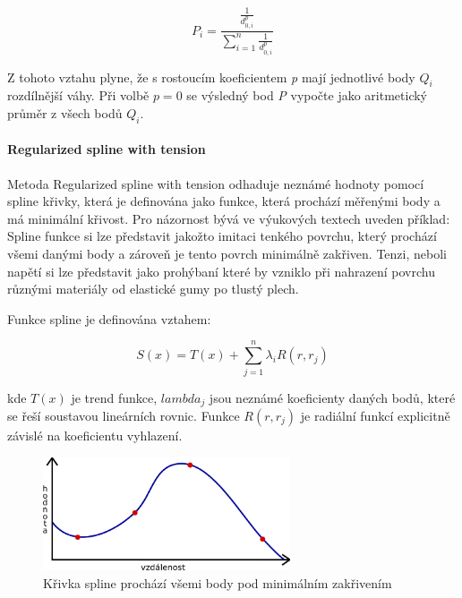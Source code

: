 \documentclass[a4paper,12pt]{report}
\begin{document}
\begin{equation}
P_{i}=\frac{\frac{1}{d_{0,i}^{p}}}{\sum_{i=1}^{n}\frac{1}{d_{0,i}^{p}}}
\end{equation}

Z tohoto vztahu plyne, že s rostoucím koeficientem \emph{p} mají jednotlivé  body $Q_{i}$ rozdílnější váhy. Při volbě $p=0$ se výsledný bod \emph{P} vypočte jako aritmetický průměr z všech bodů $Q_{i}$.

\paragraph*{Regularized spline with tension}

Metoda Regularized spline with tension odhaduje neznámé hodnoty pomocí spline křivky, která je definována jako funkce, která prochází měřenými body a má minimální křivost. Pro názornost bývá ve výukových textech uveden příklad: Spline funkce si lze představit jakožto imitaci tenkého povrchu, který prochází všemi danými body a zároveň je tento povrch minimálně zakřiven. Tenzi, neboli napětí si lze představit jako prohýbaní které by vzniklo při nahrazení povrchu různými materiály od elastické gumy po tlustý plech.

Funkce spline je definována vztahem:

\begin{equation}
S(x)=T(x)+\sum_{j=1}^{n}\lambda_{i}R(r,r_{j})
\end{equation}

kde $T(x)$ je trend funkce, $lambda_{j}$ jsou neznámé koeficienty daných bodů, které se řeší soustavou lineárních rovnic. Funkce $R(r,r_{j})$ je radiální funkcí explicitně závislé na koeficientu vyhlazení. \cite{rst}


\begin{figure}[h!]
    \centering
    \includegraphics[width=0.65\textwidth]{./img/interpolace/spline.png}
    \caption[Bilinear interpol.]{\centering  Křivka spline prochází všemi body pod minimálním zakřivením \footnotemark}
 \end{figure}   
\end{document}
